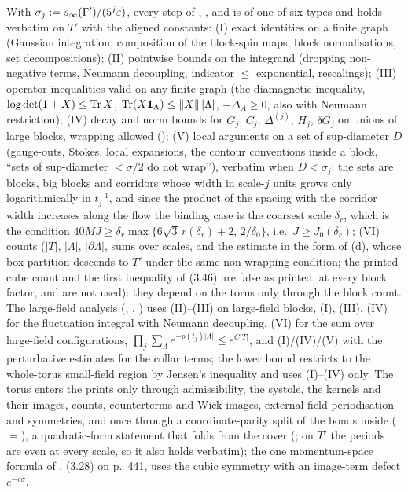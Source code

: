 \begin{lemma}\label{rot:lem:TC}
With $\sigma_j:= s_\infty(\Gamma')/(5^j\varepsilon)$, every step of \cite[\S\S2--4]{Ba1}, \cite[\S\S2--3]{Ba2}, \cite[\S\S1--3]{Ba3} and \cite[\S3]{K1} is of one of six types and holds verbatim on $T'$ with the aligned constants: \textup{(I)} exact identities on a finite graph (Gaussian integration, composition of the block-spin maps, block normalisations, set decompositions); \textup{(II)} pointwise bounds on the integrand (dropping non-negative terms, Neumann decoupling, indicator $\le$ exponential, rescalings); \textup{(III)} operator inequalities valid on any finite graph (the diamagnetic inequality, $\log\det(1+X)\le\operatorname{Tr} X$, $\operatorname{Tr}(X\mathbf 1_\Lambda)\le\|X\|\,|\Lambda|$, $-\Delta_A\ge0$, also with Neumann restriction); \textup{(IV)} decay and norm bounds for $G_j$, $C_j$, $\Delta^{(j)}$, $H_j$, $\delta G_j$ on unions of large blocks, wrapping allowed (); \textup{(V)} local arguments on a set of sup-diameter $D$ (gauge-outs, Stokes, local expansions, the contour conventions inside a block, ``sets of sup-diameter $<\sigma/2$ do not wrap''), verbatim when $D<\sigma_j$: the sets are blocks, big blocks and corridors whose width in scale-$j$ units grows only logarithmically in $t_j^{-1}$, and since the product of the spacing with the corridor width increases along the flow the binding case is the coarsest scale $\delta_r$, which is the condition $40MJ\ge\delta_r\max\{6\sqrt3\,r(\delta_r)+2,\,2/\delta_0\}$, i.e.\ $J\ge J_0(\delta_r)$; \textup{(VI)} counts ($|T|$, $|\Lambda|$, $|\partial\Lambda|$, sums over scales, and the estimate \cite[(3.42)]{Ba2} in the form of (d), whose box partition descends to $T'$ under the same non-wrapping condition; the printed cube count \cite[(3.45)]{Ba2} and the first inequality of (3.46) are false as printed, at every block factor, and are not used): they depend on the torus only through the block count. The large-field analysis (\cite[\S3]{Ba2}, \cite[\S4]{Ba1}, \cite[\S3.2]{K1}) uses (II)--(III) on large-field blocks, (I), (III), (IV) for the fluctuation integral with Neumann decoupling, (VI) for the sum over large-field configurations, $\prod_j\sum_\Lambda e^{-p(t_j)|\Lambda|}\le e^{C|T|}$, and (I)/(IV)/(V) with the perturbative estimates for the collar terms; the lower bound \cite[\S4]{Ba1} restricts to the whole-torus small-field region by Jensen's inequality and uses (I)--(IV) only. The torus enters the prints only through admissibility, the systole, the kernels and their images, counts, counterterms and Wick images, external-field periodisation and symmetries, and once through a coordinate-parity split of the bonds inside \cite[Prop.~3.1$'$]{Ba4} ($=$\cite[(3.29)]{Ba2}), a quadratic-form statement that folds from the cover (; on $T'$ the periods are even at every scale, so it also holds verbatim); the one momentum-space formula of \cite{Ba3}, (3.28) on p.~441, uses the cubic symmetry with an image-term defect $e^{-c\sigma}$.
\end{lemma}
